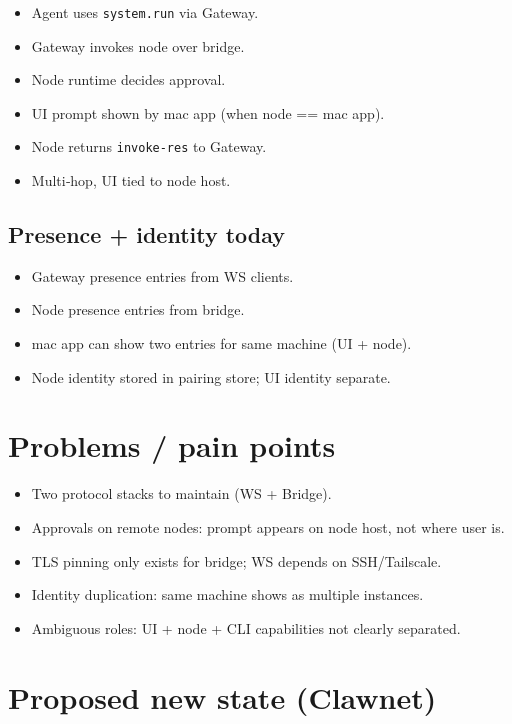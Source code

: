 \begin{itemize}
  \item Agent uses \texttt{system.run} via Gateway.
  \item Gateway invokes node over bridge.
  \item Node runtime decides approval.
  \item UI prompt shown by mac app (when node == mac app).
  \item Node returns \texttt{invoke-res} to Gateway.
  \item Multi‑hop, UI tied to node host.
\end{itemize}


\subsection{Presence + identity today}


\begin{itemize}
  \item Gateway presence entries from WS clients.
  \item Node presence entries from bridge.
  \item mac app can show two entries for same machine (UI + node).
  \item Node identity stored in pairing store; UI identity separate.
\end{itemize}


\hrulefill


\section{Problems / pain points}


\begin{itemize}
  \item Two protocol stacks to maintain (WS + Bridge).
  \item Approvals on remote nodes: prompt appears on node host, not where user is.
  \item TLS pinning only exists for bridge; WS depends on SSH/Tailscale.
  \item Identity duplication: same machine shows as multiple instances.
  \item Ambiguous roles: UI + node + CLI capabilities not clearly separated.
\end{itemize}


\hrulefill


\section{Proposed new state (Clawnet)}


